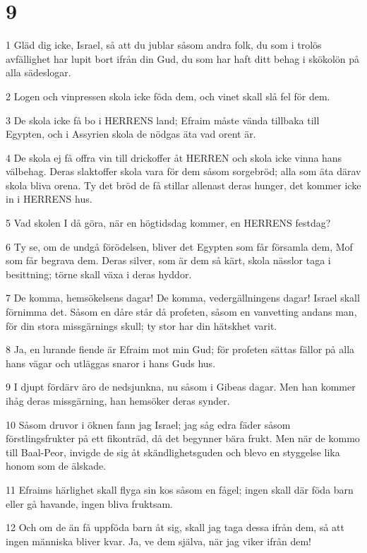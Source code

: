 \chapter{9}

\par 1 Gläd dig icke, Israel, så att du jublar såsom andra folk, du som i trolös avfällighet har lupit bort ifrån din Gud, du som har haft ditt behag i skökolön på alla sädeslogar.
\par 2 Logen och vinpressen skola icke föda dem, och vinet skall slå fel för dem.
\par 3 De skola icke få bo i HERRENS land; Efraim måste vända tillbaka till Egypten, och i Assyrien skola de nödgas äta vad orent är.
\par 4 De skola ej få offra vin till drickoffer åt HERREN och skola icke vinna hans välbehag. Deras slaktoffer skola vara för dem såsom sorgebröd; alla som äta därav skola bliva orena. Ty det bröd de få stillar allenast deras hunger, det kommer icke in i HERRENS hus.
\par 5 Vad skolen I då göra, när en högtidsdag kommer, en HERRENS festdag?
\par 6 Ty se, om de undgå förödelsen, bliver det Egypten som får församla dem, Mof som får begrava dem. Deras silver, som är dem så kärt, skola nässlor taga i besittning; törne skall växa i deras hyddor.
\par 7 De komma, hemsökelsens dagar! De komma, vedergällningens dagar! Israel skall förnimma det. Såsom en dåre står då profeten, såsom en vanvetting andans man, för din stora missgärnings skull; ty stor har din hätskhet varit.
\par 8 Ja, en lurande fiende är Efraim mot min Gud; för profeten sättas fällor på alla hans vägar och utläggas snaror i hans Guds hus.
\par 9 I djupt fördärv äro de nedsjunkna, nu såsom i Gibeas dagar. Men han kommer ihåg deras missgärning, han hemsöker deras synder.
\par 10 Såsom druvor i öknen fann jag Israel; jag såg edra fäder såsom förstlingsfrukter på ett fikonträd, då det begynner bära frukt. Men när de kommo till Baal-Peor, invigde de sig åt skändlighetsguden och blevo en styggelse lika honom som de älskade.
\par 11 Efraims härlighet skall flyga sin kos såsom en fågel; ingen skall där föda barn eller gå havande, ingen bliva fruktsam.
\par 12 Och om de än få uppföda barn åt sig, skall jag taga dessa ifrån dem, så att ingen människa bliver kvar. Ja, ve dem själva, när jag viker ifrån dem!
